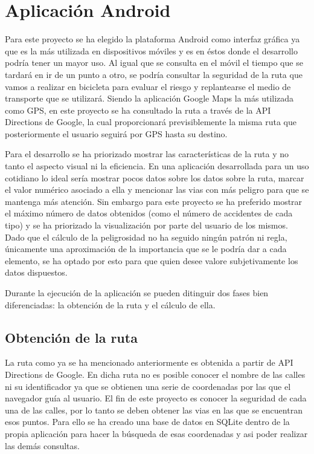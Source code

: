 \chapter{Aplicación Android}

Para este proyecto se ha elegido la plataforma Android como interfaz gráfica ya que es la más utilizada en dispositivos móviles y es en éstos donde el desarrollo podría tener un mayor uso.
Al igual que se consulta en el móvil el tiempo que se tardará en ir de un punto a otro, se podría consultar la seguridad de la ruta que vamos a realizar en bicicleta para evaluar el riesgo y replantearse el medio de transporte que se utilizará.
Siendo la aplicación Google Maps la más utilizada como GPS, en este proyecto se ha consultado la ruta a través de la API Directions de Google\cite{apiDirections}, la cual  proporcionará previsiblemente la misma ruta que posteriormente el usuario seguirá por GPS hasta su destino.

Para el desarrollo se ha priorizado mostrar las características de la ruta y no tanto el aspecto visual ni la eficiencia. En una aplicación desarrollada para un uso cotidiano lo ideal sería mostrar pocos datos sobre los datos sobre la ruta, marcar el valor numérico asociado a ella y mencionar las vias con más peligro para que se mantenga más atención. Sin embargo para este proyecto se ha preferido mostrar el máximo número de datos obtenidos (como el número de accidentes de cada tipo) y se ha priorizado la visualización por parte del usuario de los mismos. Dado que el cálculo de la peligrosidad no ha seguido ningún patrón ni regla, únicamente una aproximación de la importancia que se le podría dar a cada elemento, se ha optado por esto para que quien desee valore subjetivamente los datos dispuestos.

Durante la ejecución de la aplicación se pueden ditinguir dos fases bien diferenciadas: la obtención de la ruta y el cálculo de ella.

\clearpage
\section{Obtención de la ruta}
La ruta como ya se ha mencionado anteriormente es obtenida a partir de API Directions de Google. En dicha ruta no es posible conocer el nombre de las calles ni su identificador ya que se obtienen una serie de coordenadas por las que el navegador guía al usuario.
El fin de este proyecto es conocer la seguridad de cada una de las calles, por lo tanto se deben obtener las vias en las que se encuentran esos puntos. Para ello se ha creado una base de datos en SQLite dentro de la propia aplicación para hacer la búsqueda de esas coordenadas y asi poder realizar las demás consultas.


